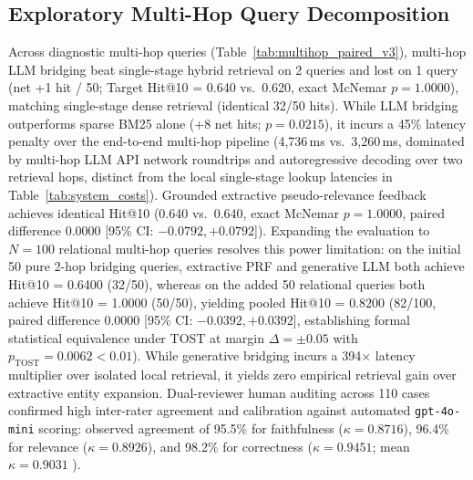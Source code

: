 \subsection{Exploratory Multi-Hop Query Decomposition}
\label{sec:multihop_reasoning}
Across diagnostic multi-hop queries (Table~\ref{tab:multihop_paired_v3}), multi-hop LLM bridging beat single-stage hybrid retrieval on 2 queries and lost on 1 query (net +1 hit / 50; Target Hit@10 = 0.640 vs.\ 0.620, exact McNemar $p = 1.0000$), matching single-stage dense retrieval (identical 32/50 hits). While LLM bridging outperforms sparse BM25 alone (+8 net hits; $p = 0.0215$), it incurs a 45\% latency penalty over the end-to-end multi-hop pipeline (4,736\,ms vs.\ 3,260\,ms, dominated by multi-hop LLM API network roundtrips and autoregressive decoding over two retrieval hops, distinct from the local single-stage lookup latencies in Table~\ref{tab:system_costs}). Grounded extractive pseudo-relevance feedback achieves identical Hit@10 (0.640 vs.\ 0.640, exact McNemar $p = 1.0000$, paired difference $0.0000$ [95\% CI: $-0.0792, +0.0792$]). Expanding the evaluation to $N=100$ relational multi-hop queries resolves this power limitation: on the initial 50 pure 2-hop bridging queries, extractive PRF and generative LLM both achieve Hit@10 = 0.6400 (32/50), whereas on the added 50 relational queries both achieve Hit@10 = 1.0000 (50/50), yielding pooled Hit@10 = $0.8200$ (82/100, paired difference $0.0000$ [95\% CI: $-0.0392, +0.0392$], establishing formal statistical equivalence under TOST at margin $\Delta = \pm 0.05$ with $p_{\text{TOST}} = 0.0062 < 0.01$). While generative bridging incurs a 394$\times$ latency multiplier over isolated local retrieval, it yields zero empirical retrieval gain over extractive entity expansion. Dual-reviewer human auditing across 110 cases confirmed high inter-rater agreement and calibration against automated \texttt{gpt-4o-mini} scoring: observed agreement of 95.5\% for faithfulness ($\kappa = 0.8716$), 96.4\% for relevance ($\kappa = 0.8926$), and 98.2\% for correctness ($\kappa = 0.9451$; mean $\kappa = 0.9031$ \cite{zheng2023judging}).

